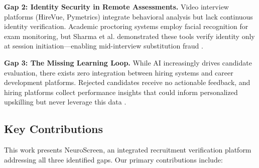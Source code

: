 \documentclass[conference]{IEEEtran}
\begin{document}
\textbf{Gap 2: Identity Security in Remote Assessments.} Video interview platforms (HireVue, Pymetrics) integrate behavioral analysis but lack continuous identity verification. Academic proctoring systems employ facial recognition for exam monitoring, but Sharma et al. demonstrated these tools verify identity only at session initiation—enabling mid-interview substitution fraud \cite{sharma2023multimodal}.

\textbf{Gap 3: The Missing Learning Loop.} While AI increasingly drives candidate evaluation, there exists zero integration between hiring systems and career development platforms. Rejected candidates receive no actionable feedback, and hiring platforms collect performance insights that could inform personalized upskilling but never leverage this data \cite{mukherjee2022impact}.

\subsection{Key Contributions}

This work presents NeuroScreen, an integrated recruitment verification platform addressing all three identified gaps. Our primary contributions include:
\end{document}

